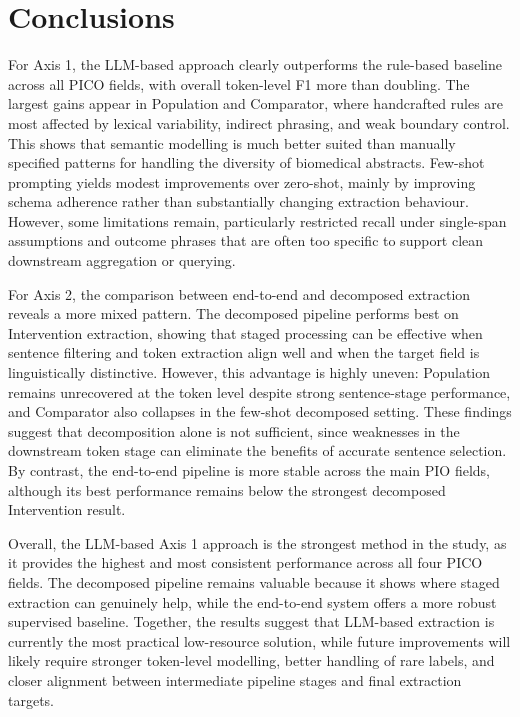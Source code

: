 \documentclass{article}
\begin{document}
\section{Conclusions}
\label{others}
For Axis 1, the LLM-based approach clearly outperforms the rule-based baseline across all PICO fields, with overall token-level F1 more than doubling. The largest gains appear in Population and Comparator, where handcrafted rules are most affected by lexical variability, indirect phrasing, and weak boundary control. This shows that semantic modelling is much better suited than manually specified patterns for handling the diversity of biomedical abstracts. Few-shot prompting yields modest improvements over zero-shot, mainly by improving schema adherence rather than substantially changing extraction behaviour. However, some limitations remain, particularly restricted recall under single-span assumptions and outcome phrases that are often too specific to support clean downstream aggregation or querying.

For Axis 2, the comparison between end-to-end and decomposed extraction reveals a more mixed pattern. The decomposed pipeline performs best on Intervention extraction, showing that staged processing can be effective when sentence filtering and token extraction align well and when the target field is linguistically distinctive. However, this advantage is highly uneven: Population remains unrecovered at the token level despite strong sentence-stage performance, and Comparator also collapses in the few-shot decomposed setting. These findings suggest that decomposition alone is not sufficient, since weaknesses in the downstream token stage can eliminate the benefits of accurate sentence selection. By contrast, the end-to-end pipeline is more stable across the main PIO fields, although its best performance remains below the strongest decomposed Intervention result.

Overall, the LLM-based Axis 1 approach is the strongest method in the study, as it provides the highest and most consistent performance across all four PICO fields. The decomposed pipeline remains valuable because it shows where staged extraction can genuinely help, while the end-to-end system offers a more robust supervised baseline. Together, the results suggest that LLM-based extraction is currently the most practical low-resource solution, while future improvements will likely require stronger token-level modelling, better handling of rare labels, and closer alignment between intermediate pipeline stages and final extraction targets.
\end{document}
